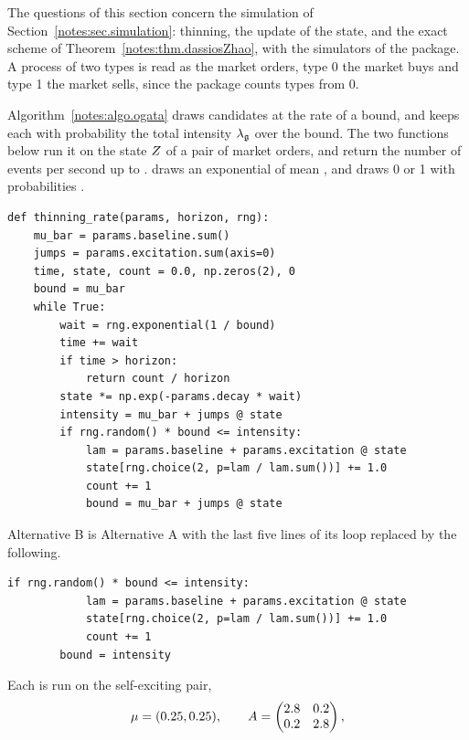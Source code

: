 The questions of this section concern the simulation of Section~\ref{notes:sec.simulation}:
thinning, the update of the state,
and the exact scheme of Theorem~\ref{notes:thm.dassiosZhao},
with the simulators of the package.
A process of two types is read as the market orders,
type 0 the market buys and type 1 the market sells,
since the package counts types from 0.

\begin{question}
\label{question.thinningBoundAfterTheJump}
Algorithm~\ref{notes:algo.ogata} draws candidates at the rate of a bound,
and keeps each with probability the total intensity $\lambda_{\mathfrak{g}}$ over the bound.
The two functions below run it on the state $Z$ of a pair of market orders,
and return the number of events per second up to .
 draws an exponential of mean ,
and  draws 0 or 1 with probabilities .
\begin{lstlisting}[caption={Alternative A}, label=listing.thinningBoundAfterTheJumpA]
def thinning_rate(params, horizon, rng):
    mu_bar = params.baseline.sum()
    jumps = params.excitation.sum(axis=0)
    time, state, count = 0.0, np.zeros(2), 0
    bound = mu_bar
    while True:
        wait = rng.exponential(1 / bound)
        time += wait
        if time > horizon:
            return count / horizon
        state *= np.exp(-params.decay * wait)
        intensity = mu_bar + jumps @ state
        if rng.random() * bound <= intensity:
            lam = params.baseline + params.excitation @ state
            state[rng.choice(2, p=lam / lam.sum())] += 1.0
            count += 1
            bound = mu_bar + jumps @ state
\end{lstlisting}
Alternative B is Alternative A with the last five lines of its loop replaced by the following.
\begin{lstlisting}[caption={Alternative B, the end of its loop}, label=listing.thinningBoundAfterTheJumpB]
        if rng.random() * bound <= intensity:
            lam = params.baseline + params.excitation @ state
            state[rng.choice(2, p=lam / lam.sum())] += 1.0
            count += 1
        bound = intensity
\end{lstlisting}
Each is run on the self-exciting pair,
\begin{equation*}
 \baseIntensity = (0.25, 0.25),
 \qquad
 \excitation = \begin{pmatrix} 2.8 & 0.2 \\ 0.2 & 2.8 \end{pmatrix},

\end{equation*}
\end{question}
